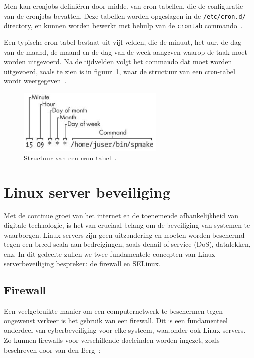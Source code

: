 Men kan cronjobs defini\"eren door middel van cron-tabellen, die de configuratie van de cronjobs bevatten.
Deze tabellen worden opgeslagen in de \texttt{/etc/cron.d/} directory, en kunnen worden bewerkt met behulp van de \texttt{crontab} commando~\autocite{ward2021linux}.

Een typische cron-tabel bestaat uit vijf velden, die de minuut, het uur, de dag van de maand, de maand en de dag van de week aangeven waarop de taak moet worden uitgevoerd.
Na de tijdvelden volgt het commando dat moet worden uitgevoerd, zoals te zien is in figuur~\ref{fig:cronjob-structure}, waar de structuur van een cron-tabel wordt weergegeven~\autocite{ward2021linux}.

\begin{figure}[h!]
    \begin{center}
        \includegraphics[width=200pt]
        {./graphics/linux/cronjob-structure.png}
        \caption[Structuur van een cron-tabel.]{\label{fig:cronjob-structure}Structuur van een cron-tabel~\autocite{ward2021linux}.}
    \end{center}
\end{figure}

\section{Linux server beveiliging}
\label{linux_server_beveiliging}

Met de continue groei van het internet en de toenemende afhankelijkheid van digitale technologie, is het van cruciaal belang om de beveiliging van systemen te waarborgen.
Linux-servers zijn geen uitzondering en moeten worden beschermd tegen een breed scala aan bedreigingen, zoals denail-of-service (DoS), datalekken, enz.
In dit gedeelte zullen we twee fundamentele concepten van Linux-serverbeveiliging bespreken: de firewall en SELinux.

\subsection{Firewall}
\label{linux_firewall}

Een veelgebruikte manier om een computernetwerk te beschermen tegen ongewenst verkeer is het gebruik van een firewall.
Dit is een fundamenteel onderdeel van cyberbeveiliging voor elke systeem, waaronder ook Linux-servers.
Zo kunnen firewalls voor verschillende doeleinden worden ingezet, zoals beschreven door van den Berg~\autocite{vandenberg}:


